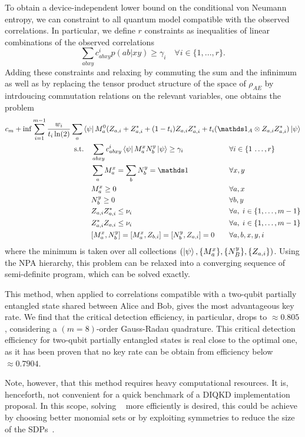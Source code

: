 To obtain a device-independent lower bound on the conditional von Neumann entropy, we can constraint  to  all quantum model compatible with the observed correlations. 
In particular, we define $r$ constraints as inequalities of linear combinations of the observed correlations 
\begin{equation}
	\sum_{abxy}c^i_{abxy}p(ab|xy) \geq \gamma_i \quad \forall i\in\{1,...,r\}.
\end{equation}
Adding these constraints and relaxing  by commuting the sum and the infinimum as well as by replacing the tensor product structure of the space of $\rho_{AE}$ by intrdoucing commutation relations on the relevant variables, one obtains the problem 
\begin{equation}
	\begin{aligned}
		c_m + \inf \sum_{i=1}^{m-1}\frac{w_i}{t_i\ln(2)}\sum_a 	\bra{\psi} M_a^0(Z_{a,i}+ Z_{a,i}^* +(1-t_i)Z_{a,i}Z_{a,i}^*+t_i(\id_A\otimes Z_{a,i} Z_{a,i}^*)\ket{\psi} \\
	\begin{alignedat}{3}
			  &\text{s.t.}\quad && \sum_{abxy} c^i_{abxy}\bra{\psi} M_a^x N_b^y \ket{\psi} \geq \gamma_i  &&\forall i\in\{1\,\dots,r\} \\
			  & && \sum_a M_a^x = \sum_b N_b^y = \id &&\forall x,y\\
			  & && M_a^x \geq 0 && \forall a,x\\
			  & && N_b^y \geq 0 && \forall b,y\\
			  & && Z_{a,i}Z_{a,i}^* \leq \nu_i &&\forall a, \; i\in\{1,\dots,m-1\} \\
			  & && Z_{a,i}^*Z_{a,i} \leq \nu_i &&\forall a, \; i\in\{1,\dots,m-1\} \\
			  & && [M_a^x,N_b^y]=[M_a^x,Z_{b,i}]=[N_b^y,Z_{a,i}] = 0 \qquad&&\forall a,b,x,y,i
	\end{alignedat}
	\end{aligned}
	\label{eq:NPA_DIQKD}
\end{equation}
where the minimum is taken over all collections $(\ket{\psi},\{M_a^x\},\{N_B^y\},\{Z_{a,i}\})$.
Using the NPA hierarchy, this problem can be relaxed into a converging sequence of semi-definite program, which can be solved exactly.

\medbreak

This method, when applied to correlations compatible with a two-qubit partially entangled state shared between Alice and Bob, gives the most advantageous key rate. 
We find that the critical detection efficiency, in particular, drops to $\approx 0.805$, considering a $(m=8)$-order Gauss-Radau quadrature.
This critical detection efficiency for two-qubit partially entangled states is real close to the optimal one, as it has been proven that no key rate can be obtain from efficiency below $\approx 0.7904$\cite{Lukanowski2022}.

Note, however, that this method requires heavy computational resources.
It is, henceforth, not convenient for a quick benchmark of a DIQKD implementation proposal.
In this scope, solving ~ more efficiently is desired, this could be achieve by choosing better monomial sets or by exploiting symmetries to reduce the size of the SDPs~\cite{Rosset2021}.
